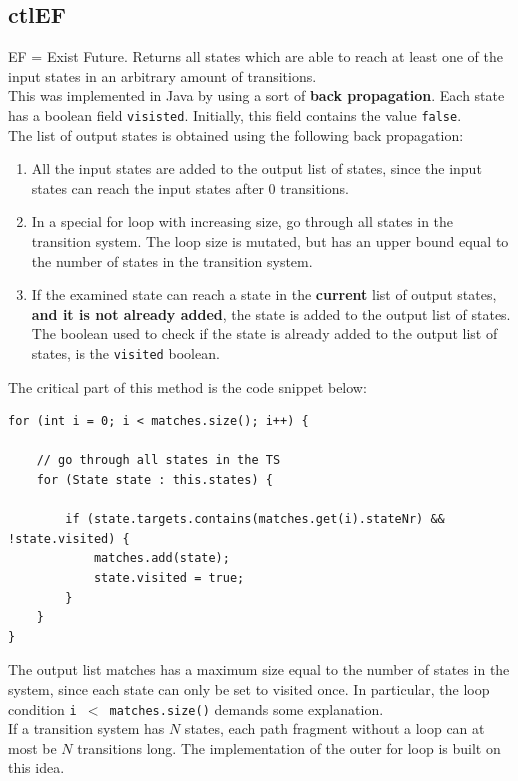 \subsection{ctlEF}
\label{sec:ctlEF}
EF = Exist Future. Returns all states which are able to reach at least one of the input states in an arbitrary amount of transitions. \\

This was implemented in Java by using a sort of \textbf{back propagation}. Each state has a boolean field \texttt{visisted}. Initially, this field contains the value \texttt{false}.\\

The list of output states is obtained using the following back propagation:
\begin{enumerate}
    \item All the input states are added to the output list of states, since the input states can reach the input states after 0 transitions.
    \item In a special for loop with increasing size, go through all states in the transition system. The loop size is mutated, but has an upper bound equal to the number of states in the transition system.
    \item If the examined state can reach a state in the \textbf{current} list of output states, \textbf{and it is not already added}, the state is added to the output list of states. The boolean used to check if the state is already added to the output list of states, is the \texttt{visited} boolean.
\end{enumerate}

The critical part of this method is the code snippet below:

\begin{lstlisting}
for (int i = 0; i < matches.size(); i++) {

	// go through all states in the TS
	for (State state : this.states) {

		if (state.targets.contains(matches.get(i).stateNr) && !state.visited) {
			matches.add(state);
			state.visited = true;
		}
	}
}
\end{lstlisting}

The output list matches has a maximum size equal to the number of states in the system, since each state can only be set to visited once. In particular, the loop condition \texttt{i $<$ matches.size()} demands some explanation. \\

If a transition system has $N$ states, each path fragment without a loop can at most be $N$ transitions long. The implementation of the outer for loop is built on this idea.\\

